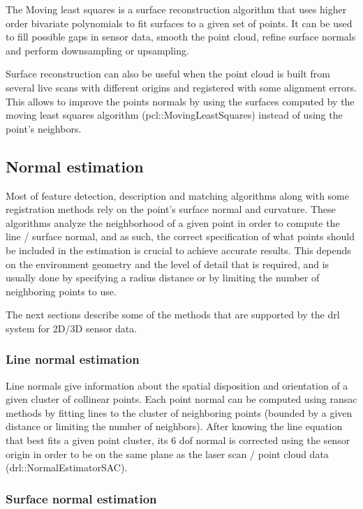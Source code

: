The Moving least squares \cite{Alexa2003} is a surface reconstruction algorithm that uses higher order bivariate polynomials to fit surfaces to a given set of points. It can be used to fill possible gaps in sensor data, smooth the point cloud, refine surface normals and perform downsampling or upsampling.

Surface reconstruction can also be useful when the point cloud is built from several live scans with different origins and registered with some alignment errors. This allows to improve the points normals by using the surfaces computed by the moving least squares algorithm (pcl::MovingLeastSquares) instead of using the point's neighbors.


\subsection{Normal estimation}

Most of feature detection, description and matching algorithms along with some registration methods rely on the point's surface normal and curvature. These algorithms analyze the neighborhood of a given point in order to compute the line / surface normal, and as such, the correct specification of what points should be included in the estimation is crucial to achieve accurate results. This depends on the environment geometry and the level of detail that is required, and is usually done by specifying a radius distance or by limiting the number of neighboring points to use.

The next sections describe some of the methods that are supported by the \gls{drl} system for 2D/3D sensor data.


\subsubsection{Line normal estimation}

Line normals give information about the spatial disposition and orientation of a given cluster of collinear points. Each point normal can be computed using \gls{ransac} methods \cite{Fischler1981} by fitting lines to the cluster of neighboring points (bounded by a given distance or limiting the number of neighbors). After knowing the line equation that best fits a given point cluster, its 6 \gls{dof} normal is corrected using the sensor origin in order to be on the same plane as the laser scan / point cloud data (drl::NormalEstimatorSAC).


\subsubsection{Surface normal estimation}

